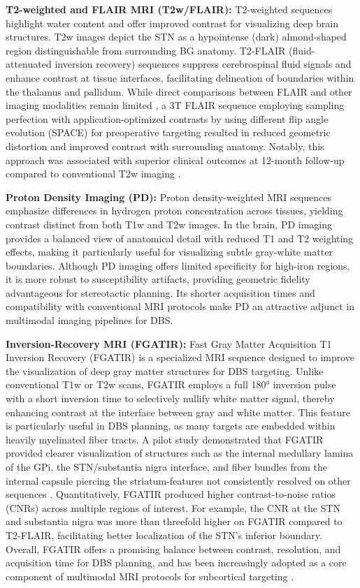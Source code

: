 \textbf{T2-weighted and FLAIR MRI (T2w/FLAIR):} T2-weighted sequences highlight water content and offer improved contrast for visualizing deep brain structures. T2w images depict the STN as a hypointense (dark) almond-shaped region distinguishable from surrounding BG anatomy. T2-FLAIR (fluid-attenuated inversion recovery) sequences suppress cerebrospinal fluid signals and enhance contrast at tissue interfaces, facilitating delineation of boundaries within the thalamus and pallidum. While direct comparisons between FLAIR and other imaging modalities remain limited \cite{Boutet2021-vg}, a 3T FLAIR sequence employing sampling perfection with application-optimized contrasts by using different flip angle evolution (SPACE) for preoperative targeting resulted in reduced geometric distortion and improved contrast with surrounding anatomy. Notably, this approach was associated with superior clinical outcomes at 12-month follow-up compared to conventional T2w imaging \cite{Senova2016-bh}.

\textbf{Proton Density Imaging (PD):}
Proton density-weighted MRI sequences emphasize differences in hydrogen proton concentration across tissues, yielding contrast distinct from both T1w and T2w images. In the brain, PD imaging provides a balanced view of anatomical detail with reduced T1 and T2 weighting effects, making it particularly useful for visualizing subtle gray-white matter boundaries. Although PD imaging offers limited specificity for high-iron regions, it is more robust to susceptibility artifacts, providing geometric fidelity advantageous for stereotactic planning. Its shorter acquisition times and compatibility with conventional MRI protocols make PD an attractive adjunct in multimodal imaging pipelines for DBS.

\textbf{Inversion-Recovery MRI (FGATIR):}  
Fast Gray Matter Acquisition T1 Inversion Recovery (FGATIR) is a specialized MRI sequence designed to improve the visualization of deep gray matter structures for DBS targeting. Unlike conventional T1w or T2w scans, FGATIR employs a full 180° inversion pulse with a short inversion time to selectively nullify white matter signal, thereby enhancing contrast at the interface between gray and white matter. This feature is particularly useful in DBS planning, as many targets are embedded within heavily myelinated fiber tracts. A pilot study demonstrated that FGATIR provided clearer visualization of structures such as the internal medullary lamina of the GPi, the STN/substantia nigra interface, and fiber bundles from the internal capsule piercing the striatum-features not consistently resolved on other sequences \cite{Sudhyadhom2009-xx}. Quantitatively, FGATIR produced higher contrast-to-noise ratios (CNRs) across multiple regions of interest. For example, the CNR at the STN and substantia nigra was more than threefold higher on FGATIR compared to T2-FLAIR, facilitating better localization of the STN's inferior boundary. Overall, FGATIR offers a promising balance between contrast, resolution, and acquisition time for DBS planning, and has been increasingly adopted as a core component of multimodal MRI protocols for subcortical targeting \cite{Neudorfer2022-nj}.

